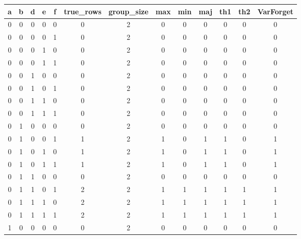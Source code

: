 \begin{table}[!tb]
    \centering
    \begin{tabular}{|c|c|c|c|c|c|c|c|c|c|c|c|c|}
        \hline
        \textbf{a} & \textbf{b} & \textbf{d} & \textbf{e} & \textbf{f} & \textbf{true\_rows} & \textbf{group\_size} & \textbf{max} & \textbf{min} & \textbf{maj} & \textbf{th1} & \textbf{th2} & \textbf{VarForget} \\ \hline
        \rowcolor{gray!40} 0 & 0 & 0 & 0 & 0 & 0 & 2 & 0 & 0 & 0 & 0 & 0 & 0 \\ \hline
        \rowcolor{blue!40} 0 & 0 & 0 & 0 & 1 & 0 & 2 & 0 & 0 & 0 & 0 & 0 & 0 \\ \hline
        \rowcolor{red!40} 0 & 0 & 0 & 1 & 0 & 0 & 2 & 0 & 0 & 0 & 0 & 0 & 0 \\ \hline
        \rowcolor{green!40} 0 & 0 & 0 & 1 & 1 & 0 & 2 & 0 & 0 & 0 & 0 & 0 & 0 \\ \hline
        \rowcolor{yellow!40} 0 & 0 & 1 & 0 & 0 & 0 & 2 & 0 & 0 & 0 & 0 & 0 & 0 \\ \hline
        \rowcolor{gray!40} 0 & 0 & 1 & 0 & 1 & 0 & 2 & 0 & 0 & 0 & 0 & 0 & 0 \\ \hline
        \rowcolor{blue!40} 0 & 0 & 1 & 1 & 0 & 0 & 2 & 0 & 0 & 0 & 0 & 0 & 0 \\ \hline
        \rowcolor{red!40} 0 & 0 & 1 & 1 & 1 & 0 & 2 & 0 & 0 & 0 & 0 & 0 & 0 \\ \hline
        \rowcolor{green!40} 0 & 1 & 0 & 0 & 0 & 0 & 2 & 0 & 0 & 0 & 0 & 0 & 0 \\ \hline
        \rowcolor{yellow!40} 0 & 1 & 0 & 0 & 1 & 1 & 2 & 1 & 0 & 1 & 1 & 0 & 1 \\ \hline
        \rowcolor{gray!40} 0 & 1 & 0 & 1 & 0 & 1 & 2 & 1 & 0 & 1 & 1 & 0 & 1 \\ \hline
        \rowcolor{blue!40} 0 & 1 & 0 & 1 & 1 & 1 & 2 & 1 & 0 & 1 & 1 & 0 & 1 \\ \hline
        \rowcolor{red!40} 0 & 1 & 1 & 0 & 0 & 0 & 2 & 0 & 0 & 0 & 0 & 0 & 0 \\ \hline
        \rowcolor{green!40} 0 & 1 & 1 & 0 & 1 & 2 & 2 & 1 & 1 & 1 & 1 & 1 & 1 \\ \hline
        \rowcolor{yellow!40} 0 & 1 & 1 & 1 & 0 & 2 & 2 & 1 & 1 & 1 & 1 & 1 & 1 \\ \hline
        \rowcolor{gray!40} 0 & 1 & 1 & 1 & 1 & 2 & 2 & 1 & 1 & 1 & 1 & 1 & 1 \\ \hline
        \rowcolor{blue!40} 1 & 0 & 0 & 0 & 0 & 0 & 2 & 0 & 0 & 0 & 0 & 0 & 0 \\ \hline

\end{tabular}
\end{table}
